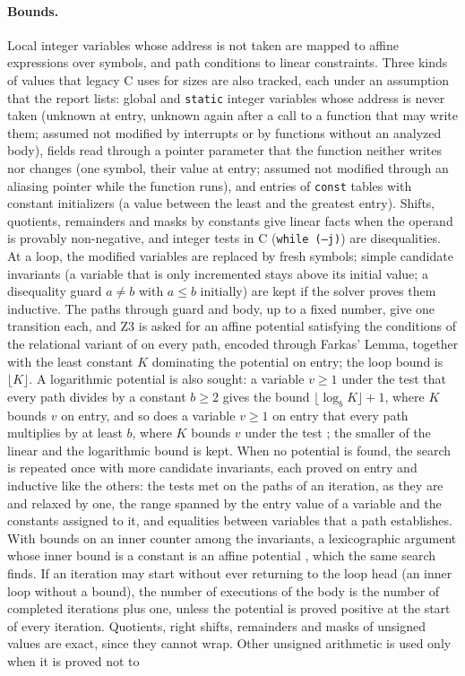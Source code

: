 \documentclass[oneside,english]{amsart}
\numberwithin{equation}{section}
\numberwithin{figure}{section}
\theoremstyle{plain}
\theoremstyle{definition}
\theoremstyle{plain}
\theoremstyle{remark}
\theoremstyle{plain}
\theoremstyle{definition}
\theoremstyle{plain}
\theoremstyle{remark}
\begin{document}
\paragraph{Bounds.}
Local integer variables whose address is not taken are mapped to affine expressions over symbols, and path conditions to linear constraints. Three kinds of values that legacy C uses for sizes are also tracked, each under an assumption that the report lists: global and \texttt{static} integer variables whose address is never taken (unknown at entry, unknown again after a call to a function that may write them; assumed not modified by interrupts or by functions without an analyzed body), fields read through a pointer parameter that the function neither writes nor changes (one symbol, their value at entry; assumed not modified through an aliasing pointer while the function runs), and entries of \texttt{const} tables with constant initializers (a value between the least and the greatest entry). Shifts, quotients, remainders and masks by constants give linear facts when the operand is provably non-negative, and integer tests in C (\texttt{while (--j)}) are disequalities. At a loop, the modified variables are replaced by fresh symbols; simple candidate invariants (a variable that is only incremented stays above its initial value; a disequality guard $a \ne b$ with $a \le b$ initially) are kept if the solver proves them inductive. The paths through guard and body, up to a fixed number, give one transition each, and Z3 \cite{demoura2008z3} is asked for an affine potential satisfying the conditions of the relational variant of \cite[Theorem~\ref{I-thm:lyapunov-bound}]{crosscheckTheory} on every path, encoded through Farkas' Lemma, together with the least constant $K$ dominating the potential on entry; the loop bound is $\lfloor K \rfloor$. A logarithmic potential is also sought: a variable $v \ge 1$ under the test that every path divides by a constant $b \ge 2$ gives the bound $\lfloor \log_b K \rfloor + 1$, where $K$ bounds $v$ on entry, and so does a variable $v \ge 1$ on entry that every path multiplies by at least $b$, where $K$ bounds $v$ under the test \cite[Proposition~\ref{I-prop:lex-log}]{crosscheckTheory}; the smaller of the linear and the logarithmic bound is kept. When no potential is found, the search is repeated once with more candidate invariants, each proved on entry and inductive like the others: the tests met on the paths of an iteration, as they are and relaxed by one, the range spanned by the entry value of a variable and the constants assigned to it, and equalities between variables that a path establishes. With bounds on an inner counter among the invariants, a lexicographic argument whose inner bound is a constant is an affine potential \cite[Proposition~\ref{I-prop:lex-log}]{crosscheckTheory}, which the same search finds. If an iteration may start without ever returning to the loop head (an inner loop without a bound), the number of executions of the body is the number of completed iterations plus one, unless the potential is proved positive at the start of every iteration. Quotients, right shifts, remainders and masks of unsigned values are exact, since they cannot wrap. Other unsigned arithmetic is used only when it is proved not to 
\end{document}
